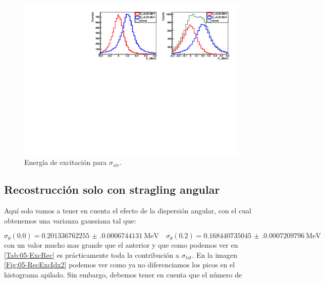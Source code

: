 \vspace*{-0.55cm}
\begin{figure}[H]
    \centering
    \includegraphics[width=1\textwidth]{Imagenes/Rec_incIdx1_single.pdf}
    \caption{Energía de excitación para $\sigma_{str}$.}
    \label{Fig:05-RecExcIdx1}
\end{figure}

\subsection{Recostrucción solo con stragling angular}

Aquí solo vamos a tener en cuenta el efecto de la dispersión angular, con el cual obtenemos una varianza gaussiana tal que: 

\begin{equation}
    \sigma_{\theta}(0.0) = \num{0.201336762255(0.0006744131)} \ \text{MeV} \quad 
    \sigma_{\theta}(0.2) = \num{0.168440735045(0.0007209796)} \ \text{MeV}
\end{equation} 
con un valor mucho mas grande que el anterior y que como podemos ver en \cref{Tab:05-ExcRec} es prácticamente toda la contribución a $\sigma_{tot}$. En la imagen \cref{Fig:05-RecExcIdx2} podemos ver como ya no diferenciamos los picos en el histograma apilado. Sin embargo, debemos tener en cuenta que el número de 

